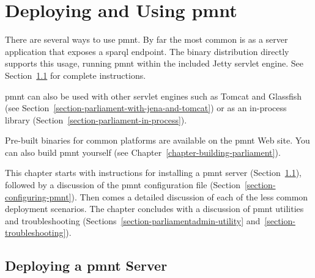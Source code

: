 
\chapter{Deploying and Using \acl{pmnt}}
\label{chapter-deploying-and-using}

There are several ways to use \ac{pmnt}.  By far the most common is as a server application that exposes a \ac{sparql} endpoint.  The binary distribution directly supports this usage, running \ac{pmnt} within the included Jetty servlet engine.  See Section~\ref{section-std-server-deploy} for complete instructions.

\ac{pmnt} can also be used with other servlet engines such as Tomcat and Glassfish (see Section~\ref{section-parliament-with-jena-and-tomcat}) or as an in-process library (Section~\ref{section-parliament-in-process}).

Pre-built binaries for common platforms are available on the \ac{pmnt} Web site.  You can also build \ac{pmnt} yourself (see Chapter~\ref{chapter-building-parliament}).

This chapter starts with instructions for installing a \ac{pmnt} server (Section~\ref{section-std-server-deploy}), followed by a discussion of the \ac{pmnt} configuration file (Section~\ref{section-configuring-pmnt}).  Then comes a detailed discussion of each of the less common deployment scenarios.  The chapter concludes with a discussion of \ac{pmnt} utilities and troubleshooting (Sections~\ref{section-parliamentadmin-utility} and~\ref{section-troubleshooting}).

\section{Deploying a \ac{pmnt} Server}
\label{section-std-server-deploy}

